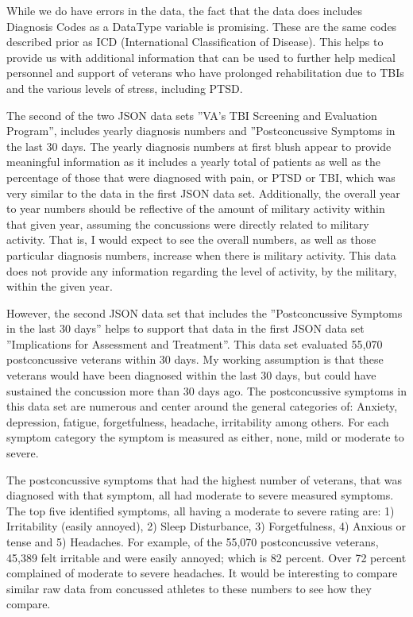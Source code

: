 \documentclass[sigconf]{acmart}
\begin{document}
While we do have errors in the data, the fact that the data does includes Diagnosis Codes as a DataType variable is promising.  These are the same codes described prior as ICD (International Classification of Disease).  This helps to provide us with additional information that can be used to further help medical personnel and support of veterans who have prolonged rehabilitation due to TBIs and the various levels of stress, including PTSD.

The second of the two JSON data sets ''VA's TBI Screening and Evaluation Program'', includes yearly diagnosis numbers and ''Postconcussive Symptoms in the last 30 days.  The yearly diagnosis numbers at first blush appear to provide meaningful information as it includes a yearly total of patients as well as the percentage of those that were diagnosed with pain, or PTSD or TBI, which was very similar to the data in the first JSON data set.  Additionally, the overall year to year numbers should be reflective of the amount of military activity within that given year, assuming the concussions were directly related to military activity.  That is, I would expect to see the overall numbers, as well as those particular diagnosis numbers, increase when there is military activity.  This data does not provide any information regarding the level of activity, by the military, within the given year.

However, the second JSON data set that includes the ''Postconcussive Symptoms in the last 30 days'' helps to support that data in the first JSON data set ''Implications for Assessment and Treatment''.  This data set evaluated 55,070 postconcussive veterans within 30 days.  My working assumption is that these veterans would have been diagnosed within the last 30 days, but could have sustained the concussion more than 30 days ago.  The postconcussive symptoms in this data set are numerous and center around the general categories of:  Anxiety, depression, fatigue, forgetfulness, headache, irritability among others.  For each symptom category the symptom is measured as either, none, mild or moderate to severe. 

The postconcussive symptoms that had the highest number of veterans, that was diagnosed with that symptom, all had moderate to severe measured symptoms.  The top five identified symptoms, all having a moderate to severe rating are: 1) Irritability (easily annoyed), 2) Sleep Disturbance, 3) Forgetfulness, 4) Anxious or tense and 5) Headaches.  For example, of the 55,070 postconcussive veterans, 45,389 felt irritable and were easily annoyed; which is 82 percent.  Over 72 percent complained of moderate to severe headaches.  It would be interesting to compare similar raw data from concussed athletes to these numbers to see how they compare.  
\end{document}

